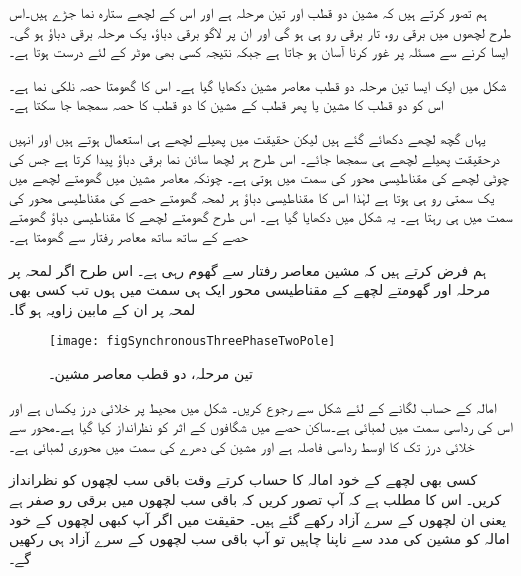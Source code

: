  ہم تصور کرتے ہیں کہ مشین دو قطب اور تین مرحلہ ہے اور اس کے لچھے ستارہ نما جڑے  ہیں۔اس طرح لچھوں میں برقی رو، تار برقی رو ہی ہو گی اور ان پر لاگو برقی دباؤ، یک مرحلہ برقی دباؤ ہو گی۔ایسا کرنے سے مسئلہ پر غور کرنا آسان ہو جاتا ہے جبکہ نتیجہ کسی بھی موٹر کے لئے درست ہوتا ہے۔

شکل   میں ایک ایسا تین مرحلہ دو قطب معاصر مشین دکھایا گیا ہے۔ اس کا گھومتا حصہ نلکی نما ہے۔اس کو دو قطب کا مشین یا پھر  قطب کے مشین کا دو قطب کا حصہ سمجھا جا سکتا ہے۔

 یہاں گچھ لچھے دکھائے گئے ہیں لیکن حقیقت میں پھیلے لچھے ہی استعمال ہوتے ہیں اور انہیں درحقیقت پھیلے لچھے ہی سمجھا جائے۔ اس طرح ہر لچھا سائن نما برقی دباؤ پیدا کرتا ہے جس کی چوٹی لچھے کی مقناطیسی محور کی سمت میں ہوتی ہے۔  چونکہ معاصر مشین میں گھومتے لچھے میں یک سمتی رو ہی ہوتا ہے لہٰذا اس کا مقناطیسی دباؤ ہر لمحہ گھومتے حصے کی مقناطیسی محور کی سمت میں ہی رہتا ہے۔ یہ شکل میں دکھایا گیا ہے۔ اس طرح گھومتے لچھے کا مقناطیسی دباؤ گھومتے حصے کے ساتھ ساتھ معاصر رفتار سے گھومتا ہے۔

ہم فرض کرتے ہیں کہ مشین معاصر رفتار  سے گھوم رہی ہے۔ اس طرح اگر لمحہ  پر مرحلہ  اور گھومتے لچھے کے مقناطیسی محور ایک ہی سمت میں ہوں تب کسی بھی لمحہ  پر ان کے مابین زاویہ  ہو گا۔
\begin{figure}
\centering
\texttt{[image: figSynchronousThreePhaseTwoPole]}
\caption{تین مرحلہ، دو قطب معاصر مشین۔}
\label{شکل_معاصر_تین_دور_دو_قطب}
\end{figure}
امالہ کے حساب لگانے کے لئے شکل   سے رجوع کریں۔ شکل میں محیط پر خلائی درز یکساں ہے  اور اس کی رداسی سمت میں لمبائی  ہے۔ساکن حصے میں شگافوں کے اثر کو نظرانداز کیا گیا ہے۔محور سے خلائی درز تک کا اوسط رداسی فاصلہ  ہے اور مشین کی دھرے کی سمت میں محوری لمبائی  ہے۔

کسی بھی لچھے کے خود امالہ کا حساب کرتے وقت باقی سب لچھوں کو نظرانداز کریں۔ اس کا مطلب ہے کہ آپ تصور کریں کہ باقی سب لچھوں میں برقی رو صفر ہے یعنی ان لچھوں  کے سرے آزاد رکھے گئے ہیں۔ حقیقت میں اگر آپ کبھی لچھوں کے خود امالہ کو مشین کی مدد سے ناپنا چاہیں تو آپ باقی سب لچھوں کے سرے آزاد ہی رکھیں گے۔ 


